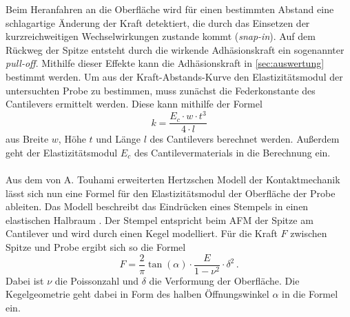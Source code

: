 Beim Heranfahren an die Oberfläche wird für einen bestimmten Abstand eine schlagartige Änderung der Kraft detektiert, die durch das Einsetzen der kurzreichweitigen Wechselwirkungen zustande kommt (\textit{snap-in}). Auf dem Rückweg der Spitze entsteht durch die wirkende Adhäsionskraft ein sogenannter \textit{pull-off}. Mithilfe dieser Effekte kann die Adhäsionskraft in \autoref{sec:auswertung} bestimmt werden.
Um aus der Kraft-Abstands-Kurve den Elastizitätsmodul der untersuchten Probe zu bestimmen, muss zunächst die Federkonstante des Cantilevers ermittelt werden. Diese kann mithilfe der Formel
\begin{equation}
  \label{eqn:federkonst}
  k = \frac{E_c\cdot w\cdot t^3}{4\cdot l}
\end{equation}
aus Breite $w$, Höhe $t$ und Länge $l$ des Cantilevers berechnet werden. \cite{afm_datasheet} Außerdem geht der Elastizitätsmodul $E_c$ des Cantilevermaterials in die Berechnung ein.\\
\\
Aus dem von A. Touhami erweiterten Hertzschen Modell der Kontaktmechanik lässt sich nun eine Formel für den Elastizitätsmodul der Oberfläche der Probe ableiten. Das Modell beschreibt das Eindrücken eines Stempels in einen elastischen Halbraum \cite{afm_datasheet}. Der Stempel entspricht beim AFM der Spitze am Cantilever und wird durch einen Kegel modelliert. Für die Kraft $F$ zwischen Spitze und Probe ergibt sich so die Formel
\begin{equation}
  \label{eqn:emodul}
  F = \frac{2}{\pi} \tan{(\alpha)}\cdot\frac{E}{1-\nu^2}\cdot\delta^2\, .
\end{equation}
Dabei ist $\nu$ die Poissonzahl und $\delta$ die Verformung der Oberfläche.
Die Kegelgeometrie geht dabei in Form des halben Öffnungswinkel $\alpha$ in die Formel ein.
